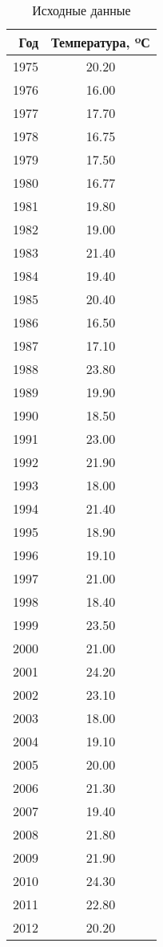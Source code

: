 \begin{table}[H]
\centering
\caption{Исходные данные} 
\label{table:source}
\begin{tabular}{|rc|}
  \hline
Год & Температура, ºС \\ 
  \hline
1975 & 20.20 \\ 
  1976 & 16.00 \\ 
  1977 & 17.70 \\ 
  1978 & 16.75 \\ 
  1979 & 17.50 \\ 
  1980 & 16.77 \\ 
  1981 & 19.80 \\ 
  1982 & 19.00 \\ 
  1983 & 21.40 \\ 
  1984 & 19.40 \\ 
  1985 & 20.40 \\ 
  1986 & 16.50 \\ 
  1987 & 17.10 \\ 
  1988 & 23.80 \\ 
  1989 & 19.90 \\ 
  1990 & 18.50 \\ 
  1991 & 23.00 \\ 
  1992 & 21.90 \\ 
  1993 & 18.00 \\ 
  1994 & 21.40 \\ 
  1995 & 18.90 \\ 
  1996 & 19.10 \\ 
  1997 & 21.00 \\ 
  1998 & 18.40 \\ 
  1999 & 23.50 \\ 
  2000 & 21.00 \\ 
  2001 & 24.20 \\ 
  2002 & 23.10 \\ 
  2003 & 18.00 \\ 
  2004 & 19.10 \\ 
  2005 & 20.00 \\ 
  2006 & 21.30 \\ 
  2007 & 19.40 \\ 
  2008 & 21.80 \\ 
  2009 & 21.90 \\ 
  2010 & 24.30 \\ 
  2011 & 22.80 \\ 
  2012 & 20.20 \\ 
   \hline
\end{tabular}
\end{table}
